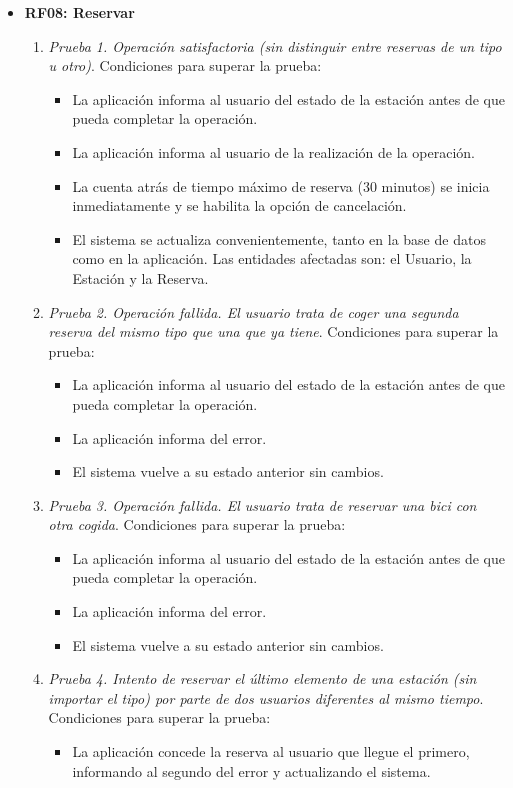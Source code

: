 \begin{itemize}
	\item \textbf{RF08: Reservar}
	\begin{enumerate}
		\item \textit{Prueba 1. Operación satisfactoria (sin distinguir entre reservas de un tipo u otro)}. Condiciones para superar la prueba:
		\begin{itemize}
			\item La aplicación informa al usuario del estado de la estación antes de que pueda completar la operación.
			\item La aplicación informa al usuario de la realización de la operación.
			\item La cuenta atrás de tiempo máximo de reserva (30 minutos) se inicia inmediatamente y se habilita la opción de cancelación.
			\item El sistema se actualiza convenientemente, tanto en la base de datos como en la aplicación. Las entidades afectadas son: el Usuario, la Estación y la Reserva.
		\end{itemize}
		\item \textit{Prueba 2. Operación fallida. El usuario trata de coger una segunda reserva del mismo tipo que una que ya tiene}. Condiciones para superar la prueba:
		\begin{itemize}
			\item La aplicación informa al usuario del estado de la estación antes de que pueda completar la operación.
			\item La aplicación informa del error.
			\item El sistema vuelve a su estado anterior sin cambios.
		\end{itemize}
		\item \textit{Prueba 3. Operación fallida. El usuario trata de reservar una bici con otra cogida}. Condiciones para superar la prueba:
		\begin{itemize}
			\item La aplicación informa al usuario del estado de la estación antes de que pueda completar la operación.
			\item La aplicación informa del error.
			\item El sistema vuelve a su estado anterior sin cambios.
		\end{itemize}
		\item \textit{Prueba 4. Intento de reservar el último elemento de una estación (sin importar el tipo) por parte de dos usuarios diferentes al mismo tiempo}. Condiciones para superar la prueba:
		\begin{itemize}
			\item La aplicación concede la reserva al usuario que llegue el primero, informando al segundo del error y actualizando el sistema.
		\end{itemize}
	\end{enumerate}
		

\end{itemize}
